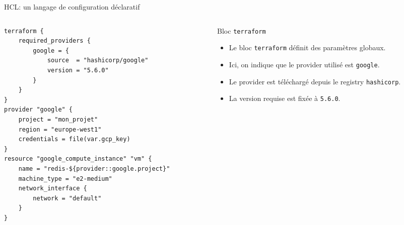 \documentclass[aspectratio=169,10pt]{beamer}
\begin{document}
\begin{frame}[fragile]{HCL: un langage de configuration déclaratif}

\begin{columns}[T]
  \begin{column}{0.55\textwidth}
    \begin{lstlisting}[language=HCL, basicstyle=\ttfamily\scriptsize]
terraform {
    required_providers {
        google = {
            source  = "hashicorp/google"   
            version = "5.6.0"
        }
    }
}
provider "google" {
    project = "mon_projet"
    region = "europe-west1"
    credentials = file(var.gcp_key)
}
resource "google_compute_instance" "vm" {
    name = "redis-${provider::google.project}"
    machine_type = "e2-medium"
    network_interface {
        network = "default"
    }
}
\end{lstlisting}
  \end{column}

  \begin{column}{0.45\textwidth}
    \begin{block}{Bloc \lstinline[language=HCL]!terraform!}
      \begin{itemize}
        \item Le bloc \lstinline[language=HCL]!terraform! définit des paramètres globaux.
        \item Ici, on indique que le provider utilisé est \texttt{google}.
        \item Le provider est téléchargé depuis le registry \texttt{hashicorp}.
        \item La version requise est fixée à \texttt{5.6.0}.
      \end{itemize}
    \end{block}
  \end{column}
\end{columns}

\end{frame}
\end{document}
